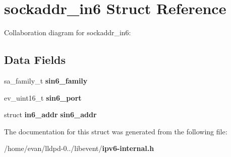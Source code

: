 \section{sockaddr\-\_\-in6 \-Struct \-Reference}
\label{structsockaddr__in6}


\-Collaboration diagram for sockaddr\-\_\-in6\-:
\subsection*{\-Data \-Fields}
\begin{DoxyCompactItemize}
\item 
sa\-\_\-family\-\_\-t {\bfseries sin6\-\_\-family}\label{structsockaddr__in6_a77cc2f6204df1469d32742070e550cd8}

\item 
ev\-\_\-uint16\-\_\-t {\bfseries sin6\-\_\-port}\label{structsockaddr__in6_aff73da703421edd977be2e0dce3f21a7}

\item 
struct {\bf in6\-\_\-addr} {\bfseries sin6\-\_\-addr}\label{structsockaddr__in6_aee0d592655d7f713ba251995b68a968a}

\end{DoxyCompactItemize}


\-The documentation for this struct was generated from the following file\-:\begin{DoxyCompactItemize}
\item 
/home/evan/lldpd-\/0../libevent/{\bf ipv6-\/internal.\-h}\end{DoxyCompactItemize}
